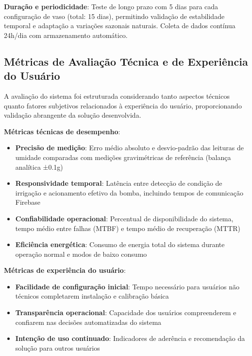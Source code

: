 \documentclass[oneside,english,brazilian]{UNISINOSmonografia}
\begin{document}
\textbf{Duração e periodicidade}: Teste de longo prazo com 5 dias para cada configuração de vaso (total: 15 dias), permitindo validação de estabilidade temporal e adaptação a variações sazonais naturais. Coleta de dados contínua 24h/dia com armazenamento automático.

\subsection{Métricas de Avaliação Técnica e de Experiência do Usuário}

A avaliação do sistema foi estruturada considerando tanto aspectos técnicos quanto fatores subjetivos relacionados à experiência do usuário, proporcionando validação abrangente da solução desenvolvida.

\textbf{Métricas técnicas de desempenho}:
\begin{itemize}
\item \textbf{Precisão de medição}: Erro médio absoluto e desvio-padrão das leituras de umidade comparadas com medições gravimétricas de referência (balança analítica ±0.1g)
\item \textbf{Responsividade temporal}: Latência entre detecção de condição de irrigação e acionamento efetivo da bomba, incluindo tempos de comunicação Firebase
\item \textbf{Confiabilidade operacional}: Percentual de disponibilidade do sistema, tempo médio entre falhas (MTBF) e tempo médio de recuperação (MTTR)
\item \textbf{Eficiência energética}: Consumo de energia total do sistema durante operação normal e modos de baixo consumo
\end{itemize}

\textbf{Métricas de experiência do usuário}:
\begin{itemize}
\item \textbf{Facilidade de configuração inicial}: Tempo necessário para usuários não técnicos completarem instalação e calibração básica
\item \textbf{Transparência operacional}: Capacidade dos usuários compreenderem e confiarem nas decisões automatizadas do sistema
\item \textbf{Intenção de uso continuado}: Indicadores de aderência e recomendação da solução para outros usuários
\end{itemize}

\end{document}

